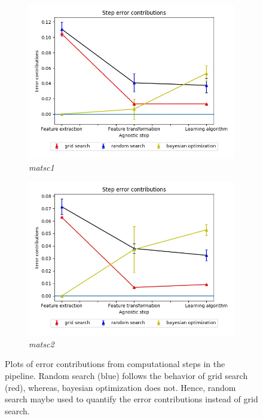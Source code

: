 \begin{figure}[ht!]
\begin{subfigure}{.5\textwidth}
  \includegraphics[scale=0.37]{img/EP/agnostic_error_step_matsc_dataset1}
  \caption{\textit{matsc1}}
  \label{fig:eq_steps_matsc1}
\end{subfigure}%
\begin{subfigure}{.5\textwidth}
  \centering
  \includegraphics[scale=0.37]{img/EP/agnostic_error_step_matsc_dataset2}
  \caption{\textit{matsc2}}
  \label{fig:eq_steps_matsc2}
\end{subfigure}
\caption{Plots of error contributions from computational steps in the pipeline. Random search (blue) follows the behavior of grid search (red), whereas, bayesian optimization does not. Hence, random search maybe used to quantify the error contributions instead of grid search.}
\label{fig:eq_steps}
\end{figure}

